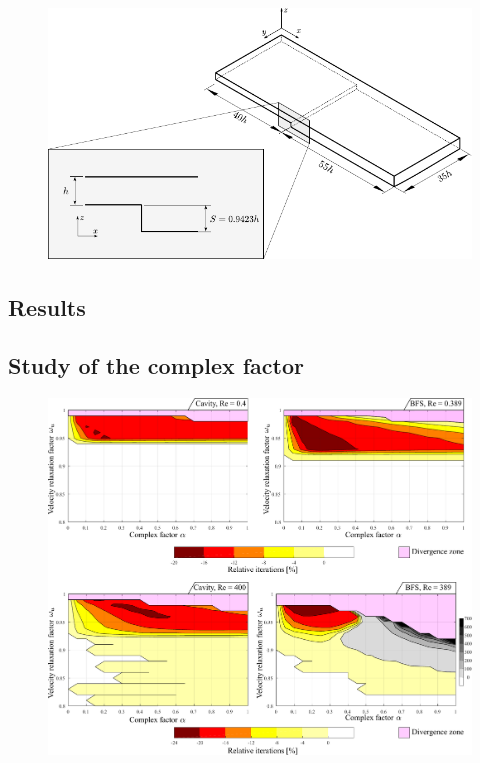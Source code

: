 \documentclass[final,3p,times,10pt,onecolumn]{myElsarticle}
\numberwithin{equation}{section}
\begin{document}
\begin{figure}[H]
\centering
\includegraphics[width=14cm]{fig/Cases/Geometria3.pdf}
\caption{}
\label{Fig:Geometria3}
\end{figure}  

\subsection{Results}

\subsection{Study of the complex factor}

\begin{figure}[H]
\centering
\includegraphics[width=17cm]{fig/Results/FactorLowRe.pdf}
\caption{}
\label{Fig:Geometria3}
\end{figure}
\end{document}
